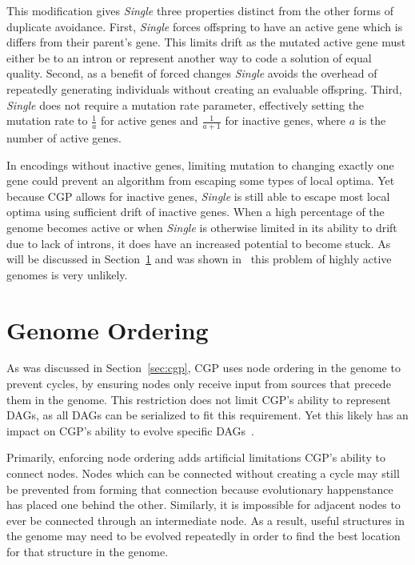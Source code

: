 \documentclass[journal]{IEEEtran}
\begin{document}
This modification gives \emph{Single} three properties distinct from the other
forms of duplicate avoidance.  First, \emph{Single} forces offspring to have
an active gene which is differs from their parent's gene.  This limits drift as the
mutated active gene must either be to an intron or represent another way to
code a solution of equal quality.  Second, as a benefit of forced changes
\emph{Single} avoids the overhead of repeatedly generating individuals without
creating an evaluable offspring.  Third, \emph{Single} does not require a mutation
rate parameter, effectively setting the mutation rate to $\frac{1}{a}$ for active
genes and $\frac{1}{a+1}$ for inactive genes, where $a$ is the number of active genes.

In encodings without inactive genes, limiting mutation to changing exactly one gene
could prevent an algorithm from escaping some types of local optima.  Yet because
CGP allows for inactive genes, \emph{Single} is still able to escape most local
optima using sufficient drift of inactive genes.  When a high percentage of
the genome becomes active or when \emph{Single} is otherwise limited in its ability
to drift due to lack of introns, it does have an increased potential to become stuck.
As will be discussed in Section~\ref{sec:ordering} and was shown in~\cite{goldman:2013:ordering}
this problem of highly active genomes is very unlikely.

\section{Genome Ordering}
\label{sec:ordering}
As was discussed in Section~\ref{sec:cgp}, CGP uses node ordering in the genome
to prevent cycles, by ensuring nodes only receive input from sources that
precede them in the genome.  This restriction does not limit CGP's ability
to represent DAGs, as all DAGs can be serialized to fit this requirement.
Yet this likely has an impact on CGP's ability to evolve specific
DAGs~\cite{goldman:2013:ordering}.

Primarily, enforcing node ordering adds artificial limitations CGP's ability to
connect nodes.  Nodes which can be connected without creating a cycle may
still be prevented from forming that connection because evolutionary happenstance
has placed one behind the other.
Similarly, it is impossible for adjacent nodes
to ever be connected through an intermediate node.  As a result, useful structures
in the genome may need to be evolved repeatedly in order to find the best
location for that structure in the genome.
\end{document}
